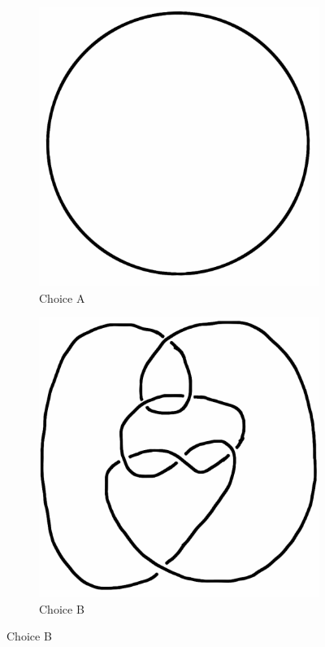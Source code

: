 \documentclass[12pt,letterpaper]{article}
\theoremstyle{definition}
\begin{document}
\begin{figure}[h!]
    \begin{subfigure}[b]{0.4\textwidth}
        \includegraphics[width=\textwidth]{knotpics/9SeptQ5a.png}
        \caption{Choice A}
    \end{subfigure}
    \hspace{2cm}
    \begin{subfigure}[b]{0.4\textwidth}
        \includegraphics[width=\textwidth]{knotpics/9SeptQ5b.png}
        \caption{Choice B}
    \end{subfigure}
\end{figure}
\end{document}
